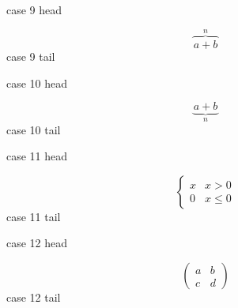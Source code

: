 \documentclass[12pt]{article}
\begin{document}
\noindent case 9 head\par
\[ \overbrace{a+b}^{n} \]
\noindent case 9 tail\par
\noindent case 10 head\par
\[ \underbrace{a+b}_{n} \]
\noindent case 10 tail\par
\noindent case 11 head\par
\[ \begin{cases} x & x>0 \\ 0 & x\le 0 \end{cases} \]
\noindent case 11 tail\par
\noindent case 12 head\par
\[ \begin{pmatrix} a & b \\ c & d \end{pmatrix} \]
\noindent case 12 tail\par
\end{document}
